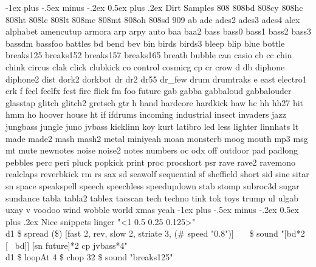 \documentclass[10pt,landscape]{article}
\makeatletter
\renewcommand{\section}{\@startsection{section}{1}{0mm}%
	{-1ex plus -.5ex minus -.2ex}%
	{0.5ex plus .2ex}%
	{\normalfont\large\bfseries}}
\makeatother
\begin{document}
\begin{multicols}{3}
		\section{Dirt Samples}
		808 808bd 808cy 808hc 808ht 808lc 808lt 808mc 808mt 808oh 808sd 909 ab ade ades2 ades3 ades4 alex alphabet amencutup armora arp arpy auto baa baa2 bass bass0 bass1 bass2 bass3 bassdm bassfoo battles bd bend bev bin birds birds3 bleep blip blue bottle breaks125 breaks152 breaks157 breaks165 breath bubble can casio cb cc chin chink circus clak click clubkick co control cosmicg cp cr crow d db diphone diphone2 dist dork2 dorkbot dr dr2 dr55 dr\_few drum drumtraks e east electro1 erk f feel feelfx fest fire flick fm foo future gab gabba gabbaloud gabbalouder glasstap glitch glitch2 gretsch gtr h hand hardcore hardkick haw hc hh hh27 hit hmm ho hoover house ht if ifdrums incoming industrial insect invaders jazz jungbass jungle juno jvbass kicklinn koy kurt latibro led less lighter linnhats lt made made2 mash mash2 metal miniyeah moan monsterb moog mouth mp3 msg mt mute newnotes noise noise2 notes numbers oc odx off outdoor pad padlong pebbles perc peri pluck popkick print proc procshort psr rave rave2 ravemono realclaps reverbkick rm rs sax sd seawolf sequential sf sheffield short sid sine sitar sn space speakspell speech speechless speedupdown stab stomp subroc3d sugar sundance tabla tabla2 tablex tacscan tech techno tink tok toys trump ul ulgab uxay v voodoo wind wobble world xmas yeah
		\section{Nice snippets}
			linger "<1 0.5 0.25 0.125>"\\
			d1 \$ spread (\$) [fast 2, rev, slow 2, striate 3, (\# speed "0.8")]
			 ~~~\$ sound "[bd*2 [~ bd]] [sn future]*2 cp jvbass*4"\\
			d1 \$ loopAt 4 \$ chop 32 \$ sound "breaks125"
	\end{multicols}
\end{document}
